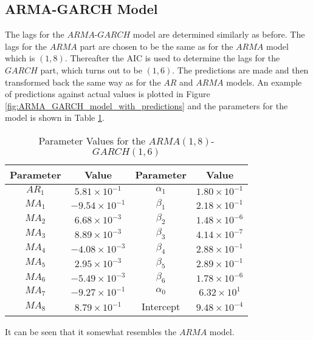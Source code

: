 \subsection{ARMA-GARCH Model}
The lags for the $ARMA$-$GARCH$ model are determined similarly as before. The lags for the $ARMA$ part are chosen to be the same as for the $ARMA$ model which is $(1,8)$. Thereafter the AIC is used to determine the lags for the $GARCH$ part, which turns out to be $(1,6)$. The predictions are made and then transformed back the same way as for the $AR$ and $ARMA$ models. An example of predictions against actual values is plotted in Figure \ref{fig:ARMA_GARCH_model_with_predictions} and the parameters for the model is shown in Table \ref{tab:params}.
\begin{table}[H]
\centering
\begin{tabular}{|c|c|c|c|}
\hline
Parameter & Value &Parameter & Value\\
\hline 
$AR_1$ & $5.81 \times 10^{-1}$ &$\alpha_1$ & $1.80 \times 10^{-1}$ \\
$MA_1$ & $-9.54 \times 10^{-1}$ &$\beta_1$ & $2.18 \times 10^{-1}$ \\
$MA_2$ & $6.68 \times 10^{-3}$ &$\beta_2$ & $1.48 \times 10^{-6}$ \\
$MA_3$ & $8.89 \times 10^{-3}$ &$\beta_3$ & $4.14 \times 10^{-7}$ \\
$MA_4$ & $-4.08 \times 10^{-3}$ &$\beta_4$ & $2.88 \times 10^{-1}$ \\
$MA_5$ & $2.95 \times 10^{-3}$  &$\beta_5$ & $2.89 \times 10^{-1}$ \\
$MA_6$ & $-5.49 \times 10^{-3}$ &$\beta_6$ & $1.78 \times 10^{-6}$ \\
$MA_7$ & $-9.27 \times 10^{-1}$ &$\alpha_0$ & $6.32 \times 10^{1}$ \\
$MA_8$ & $8.79 \times 10^{-1}$ & Intercept & $9.48 \times 10^{-4}$ \\
\hline
\end{tabular}
\caption{Parameter Values for the $ARMA(1,8)$-$GARCH(1,6)$}
\label{tab:params}
\end{table}
It can be seen that it somewhat resembles the $ARMA$ model.


